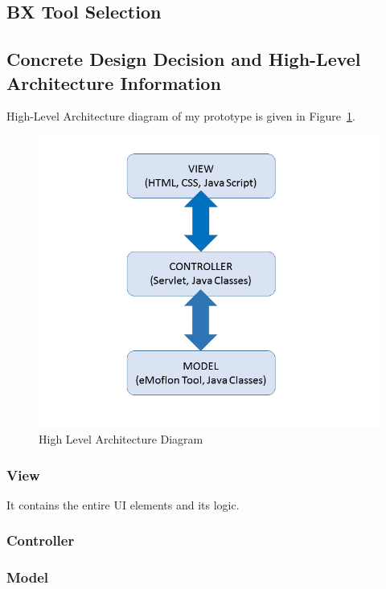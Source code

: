 \subsection{BX Tool Selection}\label{subsec:bxtoolselection}

\subsection{Concrete Design Decision and High-Level Architecture Information}\label{subsec:concretedesign}
High-Level Architecture diagram of my prototype is given in Figure~\ref{fig:Architecture_Diagram}.
\begin{figure}
	\includegraphics[width=1\textwidth]{figures/Highlevel_Arch}
	\caption{High Level Architecture Diagram}
	\label{fig:Architecture_Diagram}
\end{figure}
\subsubsection{View}\label{subsubsec:view}
It contains the entire UI elements and its logic.
\subsubsection{Controller}\label{subsubsec:controller}
\subsubsection{Model}\label{subsubsec:model}






